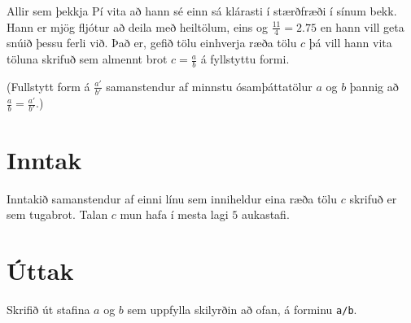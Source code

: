 

Allir sem þekkja Pí vita að hann sé einn sá klárasti í stærðfræði í sínum bekk.
Hann er mjög fljótur að deila með heiltölum, eins og $\frac{11}{4} = 2.75$ en
hann vill geta snúið þessu ferli við. Það er, gefið tölu einhverja ræða tölu
$c$ þá vill hann vita töluna skrifuð sem almennt brot $c = \frac{a}{b}$ á
fyllstyttu formi.

(Fullstytt form á $\frac{a'}{b'}$ samanstendur af minnstu ósamþáttatölur $a$ og
$b$ þannig að $\frac{a}{b} = \frac{a'}{b'}$.)

\section*{Inntak}
Inntakið samanstendur af einni línu sem inniheldur eina ræða tölu $c$ skrifuð
er sem tugabrot. Talan $c$ mun hafa í mesta lagi $5$ aukastafi.

\section*{Úttak}
Skrifið út stafina $a$ og $b$ sem uppfylla skilyrðin að ofan, á forminu \texttt{a/b}.
